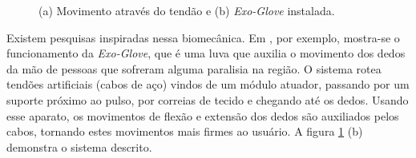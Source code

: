 \documentclass[
	12pt,				%
	openright,			%
	oneside,			%
	a4paper,			%
	english,			%
	brazil				%
	]{abntex2}
\begin{document}
	\begin{figure}[!htb]
		 \centering
		 \caption{(a) Movimento através do tendão e (b) \textit{Exo-Glove} instalada.} 
		 \centering
		 \label{Fig:hand-tendon-flex1-and-exo-glove1}
	\end{figure}


		Existem pesquisas inspiradas nessa biomecânica. Em \cite{hyunki2015exoglove}, por exemplo, mostra-se o funcionamento  da \textit{Exo-Glove}, que é uma luva que auxilia o movimento dos dedos da mão de pessoas que sofreram alguma paralisia na região. O sistema rotea tendões artificiais (cabos de aço) vindos de um módulo atuador, passando por um suporte próximo ao pulso, por correias de tecido e chegando até os dedos. Usando esse aparato, os movimentos de flexão e extensão dos dedos são auxiliados pelos cabos, tornando estes movimentos mais firmes ao usuário. A figura \ref{Fig:hand-tendon-flex1-and-exo-glove1} (b) demonstra o sistema descrito.
\end{document}
